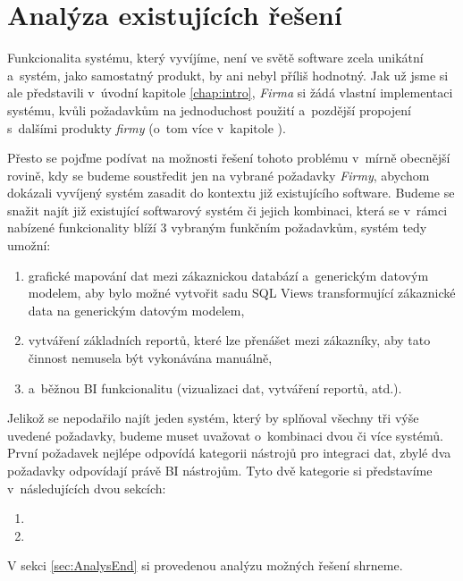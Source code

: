 \chapter{Analýza existujících řešení}\label{chap:analysis}

Funkcionalita systému, který vyvíjíme, není ve světě software zcela unikátní a~systém, jako samostatný produkt, by ani nebyl příliš hodnotný.
Jak už jsme si ale představili v~úvodní kapitole \ref{chap:intro}, \textit{Firma} si žádá vlastní implementaci systému, kvůli požadavkům na jednoduchost použití a~pozdější propojení s~dalšími produkty \textit{firmy} (o~tom více v~kapitole ).

Přesto se pojďme podívat na možnosti řešení tohoto problému v~mírně obecnější rovině, kdy se budeme soustředit jen na vybrané požadavky \textit{Firmy}, abychom dokázali vyvíjený systém zasadit do kontextu již existujícího software.
Budeme se snažit najít již existující softwarový systém či jejich kombinaci, která se v~rámci nabízené funkcionality blíží 3 vybraným funkčním požadavkům, systém tedy umožní:

\begin{enumerate}
    \item grafické mapování dat mezi zákaznickou databází a~generickým datovým modelem, aby bylo možné vytvořit sadu SQL Views transformující zákaznické data na generickým datovým modelem,
    \item vytváření základních reportů, které lze přenášet mezi zákazníky, aby tato činnost nemusela být vykonávána manuálně,
    \item a~běžnou BI funkcionalitu (vizualizaci dat, vytváření reportů, atd.).
\end{enumerate}

Jelikož se nepodařilo najít jeden systém, který by splňoval všechny tři výše uvedené požadavky, budeme muset uvažovat o~kombinaci dvou či více systémů.
První požadavek nejlépe odpovídá kategorii nástrojů pro integraci dat, zbylé dva požadavky odpovídají právě BI nástrojům.
Tyto dvě kategorie si představíme v~následujících dvou sekcích:

\begin{enumerate}
    \item {}
    \item {}
\end{enumerate}

V sekci \ref{sec:AnalysEnd} si provedenou analýzu možných řešení shrneme.

